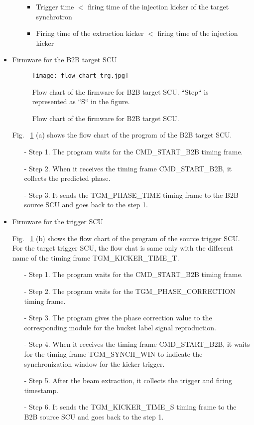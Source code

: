 \begin{itemize}
\begin{itemize}
\begin{itemize}
	\item Trigger time $<$ firing time of the injection kicker of the target synchrotron

	\item Firing time of the extraction kicker $<$ firing time of the injection kicker
\end{itemize}
 

	\end{itemize}
\item Firmware for the B2B target SCU
\begin{figure}[H]
   \centering   
   \texttt{[image: flow\_chart\_trg.jpg]}
   \caption{Flow chart of the firmware for B2B target SCU.}{Flow chart of the firmware for B2B target SCU. ``Step`` is represented as ``S`` in the figure.}
   \label{flow_chart_trg}
\end{figure}
Fig. ~\ref{flow_chart_trg} (a) shows the flow chart of the program of the B2B target SCU.
 	\begin{itemize}
		\item[-]Step 1. The program waits for the CMD\_START\_B2B timing frame.
 		\item[-]Step 2. When it receives the timing frame CMD\_START\_B2B, it collects the predicted phase.
		\item[-]Step 3. It sends the TGM\_PHASE\_TIME timing frame to the B2B source SCU and goes back to the step 1.
	\end{itemize}
\item Firmware for the trigger SCU

Fig. ~\ref{flow_chart_trg} (b) shows the flow chart of the program of the source trigger SCU. For the target trigger SCU, the flow chat is same only with the different name of the timing frame TGM\_KICKER\_TIME\_T.
 	\begin{itemize}
		\item[-]Step 1. The program waits for the CMD\_START\_B2B timing frame.
		\item[-]Step 2. The program waits for the TGM\_PHASE\_CORRECTION timing frame.
		\item[-]Step 3. The program gives the phase correction value to the corresponding module for the bucket label signal reproduction.
 		\item[-]Step 4. When it receives the timing frame CMD\_START\_B2B, it waits for the timing frame TGM\_SYNCH\_WIN to indicate the synchronization window for the kicker trigger.
		\item[-]Step 5. After the beam extraction, it collects the trigger and firing timestamp. 
		\item[-]Step 6. It sends the TGM\_KICKER\_TIME\_S timing frame to the B2B source SCU and goes back to the step 1.
	\end{itemize}

\end{itemize}
